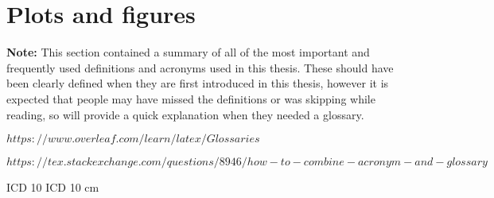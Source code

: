\chapter{Plots and figures}

\textbf{Note:} This section contained a summary of all of the most important and frequently used definitions and acronyms used in this thesis. These should have been clearly defined when they are first introduced in this thesis, however it is expected that people may have missed the definitions or was skipping while reading, so will provide a quick explanation when they needed a glossary. 


$https://www.overleaf.com/learn/latex/Glossaries$

$https://tex.stackexchange.com/questions/8946/how-to-combine-acronym-and-glossary$


ICD 10
ICD 10 cm



\clearpage


